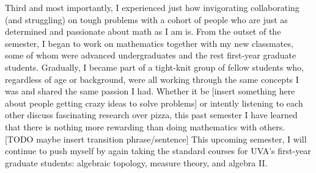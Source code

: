 \documentclass[12pt]{article}
\begin{document}


Third and most importantly, I experienced just how invigorating collaborating (and struggling) on tough problems with a cohort of people who are just as determined and passionate about math as I am is. From the outset of the semester, I began to work on mathematics together with my new classmates, some of whom were advanced undergraduates and the rest first-year graduate students. Gradually, I became part of a tight-knit group of fellow students who, regardless of age or background, were all working through the same concepts I was and shared the same passion I had. Whether it be [insert something here about people getting crazy ideas to solve problems] or intently listening to each other discuss fascinating research over pizza, this past semester I have learned that there is nothing more rewarding than doing mathematics with others.
\\

[TODO maybe insert transition phrase/sentence] This upcoming semester, I will continue to push myself by again taking the standard courses for UVA's first-year graduate students: algebraic topology, measure theory, and algebra II.
\\





\end{document}
